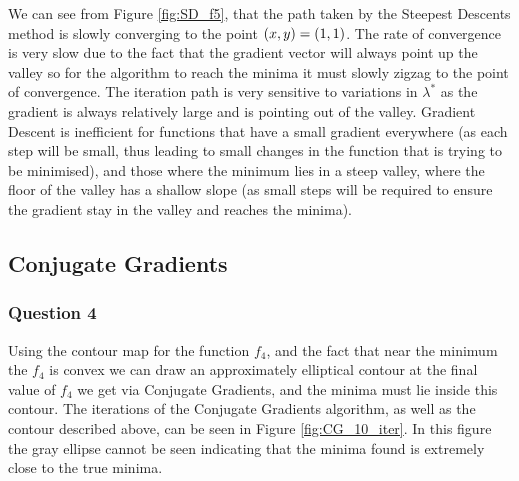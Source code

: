 \documentclass[11pt]{article} %
\let\originalleft\left
\let\originalright\right
\renewcommand{\left}{\mathopen{}\mathclose\bgroup\originalleft}
\renewcommand{\right}{\aftergroup\egroup\originalright}
\begin{document}
We can see from Figure \ref{fig:SD_f5}, that the path taken by the Steepest Descents method is slowly converging to the point $\left(x, y\right) = \left(1, 1 \right)$. The rate of convergence is very slow due to the fact that the gradient vector will always point up the valley so for the algorithm to reach the minima it must slowly zigzag to the point of convergence. The iteration path is very sensitive to variations in $\lambda^*$ as the gradient is always relatively large and is pointing out of the valley. Gradient Descent is inefficient for functions that have a small gradient everywhere (as each step will be small, thus leading to small changes in the function that is trying to be minimised), and those where the minimum lies in a steep valley, where the floor of the valley has a shallow slope (as small steps will be required to ensure the gradient stay in the valley and reaches the minima).

\subsection*{Conjugate Gradients}

\subsubsection*{Question 4}

Using the contour map for the function $f_4$, and the fact that near the minimum the $f_4$ is convex we can draw an approximately elliptical contour at the final value of $f_4$ we get via Conjugate Gradients, and the minima must lie inside this contour. The iterations of the Conjugate Gradients algorithm, as well as the contour described above, can be seen in Figure \ref{fig:CG_10_iter}. In this figure the gray ellipse cannot be seen indicating that the minima found is extremely close to the true minima.
\end{document}
